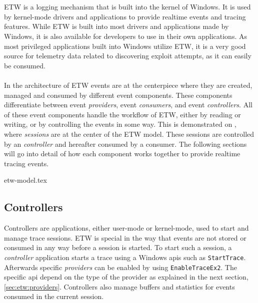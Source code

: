 \documentclass{report}
\begin{document}
\section{}
\label{cha:etw}
\gls{ETW} is a logging mechanism that is built into the kernel of Windows. It is used by kernel-mode drivers and applications to provide realtime events and tracing features. While \gls{ETW} is built into most drivers and applications made by Windows, it is also available for developers to use in their own applications. As most privileged applications built into Windows utilize \gls{ETW}, it is a very good source for telemetry data related to discovering exploit attempts, as it can easily be consumed.
\\
\\
In the architecture of \gls{ETW} events are at the centerpiece where they are created, managed and consumed by different event components\cite{url:etw:about}. These components differentiate between event \emph{providers}, event \emph{consumers}, and event \emph{controllers}. All of these event components handle the workflow of \gls{ETW}, either by reading or writing, or by controlling the events in some way. This is demonstrated on , where \emph{sessions} are at the center of the \gls{ETW} model. These sessions are controlled by an \emph{controller} and hereafter consumed by a consumer. The following sections will go into detail of how each component works together to provide realtime tracing events.

{etw-model.tex}

\subsection{Controllers}
Controllers are applications, either user-mode or kernel-mode, used to start and manage trace sessions. \gls{ETW} is special in the way that events are not stored or consumed in any way before a session is started. To start such a session, a \emph{controller} application starts a trace using a Windows \gls{api}s such as \texttt{StartTrace}. Afterwards specific \emph{providers} can be enabled by using \texttt{EnableTraceEx2}. The specific \gls{api} depend on the type of the provider as explained in the next section, \ref{sec:etw:providers}. Controllers also manage buffers and statistics for events consumed in the current session.
\end{document}
